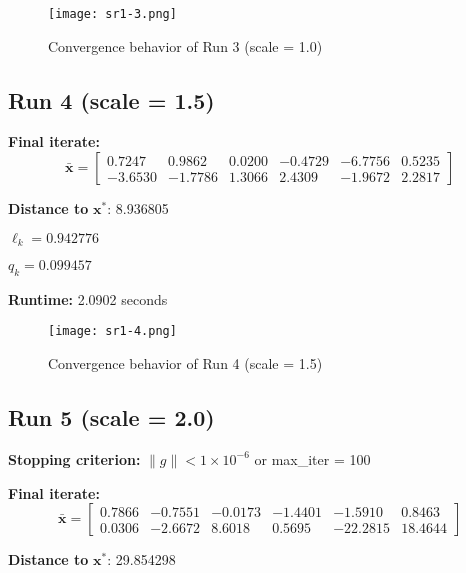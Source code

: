 \documentclass{article}
\begin{document}
\begin{figure}[H]
    \centering
    \texttt{[image: sr1-3.png]}
    \caption{Convergence behavior of Run 3 (scale = 1.0)}
\end{figure}


\subsection*{Run 4 (scale = 1.5)}
\vspace{1em}

\textbf{Final iterate:}
\[
\bar{\mathbf{x}} =
\begin{bmatrix}
0.7247 & 0.9862 & 0.0200 & -0.4729 & -6.7756 & 0.5235 \\
-3.6530 & -1.7786 & 1.3066 & 2.4309 & -1.9672 & 2.2817
\end{bmatrix}
\]

\vspace{0.5em}
\noindent
\textbf{Distance to } $\mathbf{x}^*$: 8.936805

\vspace{0.5em}
\noindent
$\ell_k = 0.942776$

\noindent
$q_k = 0.099457$

\vspace{0.5em}
\noindent
\textbf{Runtime:} 2.0902 seconds

\begin{figure}[H]
    \centering
    \texttt{[image: sr1-4.png]}
    \caption{Convergence behavior of Run 4 (scale = 1.5)}
\end{figure}



\subsection*{Run 5 (scale = 2.0)}
\vspace{1em}

\textbf{Stopping criterion:} $\|g\| < 1 \times 10^{-6}$ or max\_iter = 100

\vspace{0.5em}
\textbf{Final iterate:}
\[
\bar{\mathbf{x}} =
\begin{bmatrix}
0.7866 & -0.7551 & -0.0173 & -1.4401 & -1.5910 & 0.8463 \\
0.0306 & -2.6672 & 8.6018 & 0.5695 & -22.2815 & 18.4644
\end{bmatrix}
\]

\vspace{0.5em}
\noindent
\textbf{Distance to } $\mathbf{x}^*$: 29.854298
\end{document}
